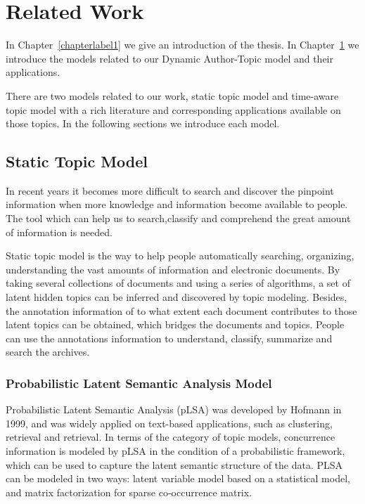 \chapter{Related Work}
\label{chapterlabel2}
In Chapter~\ref{chapterlabel1} we give an introduction of the thesis. In Chapter~\ref{chapterlabel2} we introduce the models related to our Dynamic Author-Topic model and their applications. 

There are two models related to our work, static topic model and time-aware topic model with a rich literature and corresponding applications available on those topics. In the following sections we introduce each model. 

\section{Static Topic Model}
In recent years it becomes more difficult to search and discover the pinpoint information when more knowledge and information become available to people. The tool which can help us to search,classify and comprehend the great amount of information is needed. 

Static topic model is the way to help people automatically searching, organizing, understanding the vast amounts of information and electronic documents. By taking several collections of documents and using a series of algorithms, a set of latent hidden topics can be inferred  and discovered by topic modeling. Besides, the annotation information of to what extent each document contributes to those latent topics can be obtained, which bridges the documents and topics. People can use the annotations information to understand, classify, summarize and search the archives.

\subsection{Probabilistic Latent Semantic Analysis Model}

Probabilistic Latent Semantic Analysis (pLSA) was developed by Hofmann \cite{hofmann1999probabilistic} in 1999, and was widely applied on text-based applications, such as clustering, retrieval and retrieval. In terms of the category of topic models, concurrence information is modeled by pLSA in the condition of a probabilistic framework, which can be used to capture the latent semantic structure of the data. PLSA can be modeled in two ways: latent variable model based on a statistical model, and matrix factorization for sparse co-occurrence matrix.

